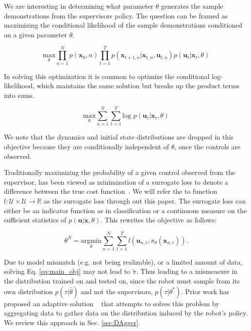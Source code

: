 \documentclass[10pt, conference]{ieeeconf}      %
\newcommand{\bu}{\mathbf{u}}
\newcommand{\bx}{\mathbf{x}}
\begin{document}
We are interesting in determining what parameter $\theta$ generates the sample demonstrations from the supervisors policy. The question can be framed as maximizing the conditional likelihood of the sample demonstrations conditioned on a given parameter $\theta$. 

$$\underset{\theta}{\mbox{max}} \prod^N_{n=1} p(\bx_0,n) \prod^T_{t=1} p(\bx_{t+1,n}|\bx_{t,n},\bu_{t,n})p(\bu_t|\bx_t,\theta)$$

In solving this optimization it is common to optimize the conditional log-likelihood, which maintains the same solution but breaks up the product terms into sums. 

\begin{equation}\label{eq:m_likeli_obj}
\underset{\theta}{\mbox{max}} \sum^N_{n=1}\sum^T_{t=1}\mbox{log }p(\bu_t|\bx_t,\theta)
\end{equation}


We note that the dynamics and initial state distributions are dropped in this objective because they are conditionally independent of $\theta$, once the controls are observed. 

 Traditionally maximizing the probability of a given control observed from the supervisor, has been viewed as minimization of a surrogate loss to denote a difference between the true cost function~\cite{ross2010reduction,ross2010efficient}. We will refer the to function $l : \mathcal{U} \times \mathcal{U} \rightarrow \mathbb{R}$ as the surrogate loss through out this paper. The surrogate loss can either be an indicator function as in classification or a continuous measure on the sufficient statistics of $p(\bu|\bx,\theta)$.  This rewrites the objective as follows: 

\begin{equation}\label{eq:main_obj}
\theta^N = \underset{\theta}{\mbox{argmin}} \sum^N_{n=1}\sum^T_{t=1} l(\bu_{n,t}, \pi_{\theta} (\bx_{n,t})).
\end{equation}


Due to model mismatch (e.g. not being realizable), or a limited amount of data, solving Eq. \ref{eq:main_obj} may not lead to $\tilde{\pi}$.  Thus leading to a mismeasure in the distribution trained on and tested on, since the robot must sample from its own distribution $p(\tau|\hat{\theta})$ and not the supervisors, $p(\tau|\theta^*)$.  Prior work has proposed an adaptive solution ~\cite{ross2010reduction} that attempts to solves this problem by aggregating data to gather data on the distribution induced by the robot's policy. We review this approach in Sec. \ref{sec:DAgger}. 
\end{document}
